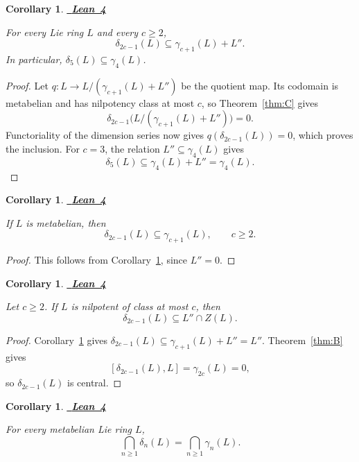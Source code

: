 \documentclass[a4paper,11pt,reqno]{amsart}
\newtheorem{corollary}[theorem]{Corollary}
\theoremstyle{definition}
\newcommand{\leanrepository}{%
  https://github.com/TimmPeterson/lie-algebras/blob/main}
\newcommand{\leanproof}[1]{%
  \leavevmode\unskip\nobreak\hfill
  \mbox{\href{#1}{\normalfont\sffamily\bfseries\footnotesize
    \textcolor{leanblue}{Lean 4}}}%
  \par\nobreak\smallskip\noindent\ignorespaces
}
\begin{document}
\begin{corollary}\label{cor:general-odd}
\leanproof{\leanrepository/LieRings/Publication/Results.lean\#L207-L215}
For every Lie ring $L$ and every $c\geq2$,
\[
              \delta_{2c-1}(L)\subseteq\gamma_{c+1}(L)+L''.
\]
In particular, $\delta_5(L)\subseteq\gamma_4(L)$.
\end{corollary}

\begin{proof}
Let $q:L\to L/(\gamma_{c+1}(L)+L'')$ be the quotient map.  Its codomain is
metabelian and has nilpotency class at most $c$, so Theorem~\ref{thm:C}
gives
\[
 \delta_{2c-1}\bigl(L/(\gamma_{c+1}(L)+L'')\bigr)=0.
\]
Functoriality of the dimension series now gives
$q(\delta_{2c-1}(L))=0$, which proves the inclusion.  For $c=3$, the
relation $L''\subseteq\gamma_4(L)$ gives
\[
 \delta_5(L)\subseteq\gamma_4(L)+L''=\gamma_4(L).
\]
\end{proof}

\begin{corollary}\label{cor:odd-metabelian}
\leanproof{\leanrepository/LieRings/Publication/Results.lean\#L217-L227}
If $L$ is metabelian, then
\[
                    \delta_{2c-1}(L)\subseteq\gamma_{c+1}(L),
                    \qquad c\geq2.
\]
\end{corollary}

\begin{proof}
This follows from Corollary~\ref{cor:general-odd}, since $L''=0$.
\end{proof}

\begin{corollary}\label{cor:nilpotent-central-derived}
\leanproof{\leanrepository/LieRings/Publication/Results.lean\#L229-L237}
Let $c\geq2$.  If $L$ is nilpotent of class at most $c$, then
\[
                         \delta_{2c-1}(L)\subseteq L''\cap Z(L).
\]
\end{corollary}

\begin{proof}
Corollary~\ref{cor:general-odd} gives
$\delta_{2c-1}(L)\subseteq\gamma_{c+1}(L)+L''=L''$.  Theorem~\ref{thm:B}
gives
\[
 [\delta_{2c-1}(L),L]=\gamma_{2c}(L)=0,
\]
so $\delta_{2c-1}(L)$ is central.
\end{proof}

\begin{corollary}\label{cor:omega}
\leanproof{\leanrepository/LieRings/Publication/Results.lean\#L239-L245}
For every metabelian Lie ring $L$,
\[
 \bigcap_{n\geq1}\delta_n(L)=\bigcap_{n\geq1}\gamma_n(L).
\]
\end{corollary}
\end{document}
